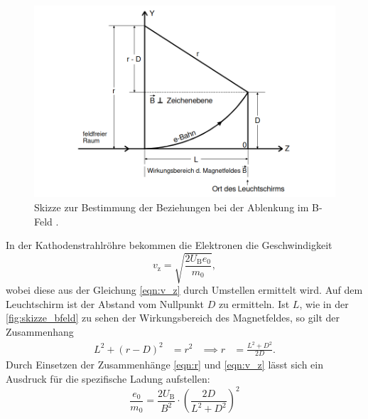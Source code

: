     \begin{figure} 
        \centering
        \includegraphics[width=\textwidth]{bilder/zeichnung_magnetfeld.png}
        \caption{Skizze zur Bestimmung der Beziehungen bei der Ablenkung im B-Feld \cite{anleitung502}.}
        \label{fig:skizze_bfeld}
    \end{figure}

    \noindent In der Kathodenstrahlröhre bekommen die Elektronen die Geschwindigkeit 
    \begin{equation*}
        v_{\text{z}} = \sqrt{\frac{2 U_{\text{B}}e_0}{m_0}},
    \end{equation*}
    wobei diese aus der Gleichung \eqref{eqn:v_z} durch Umstellen ermittelt wird. Auf dem Leuchtschirm ist der Abstand vom Nullpunkt $D$ zu ermitteln.
    Ist $L$, wie in der \autoref{fig:skizze_bfeld} zu sehen der Wirkungsbereich des Magnetfeldes, so gilt der Zusammenhang
    \begin{align*}
        L^2 + (r - D)^2 &= r^2  &\implies r &= \frac{L^2 + D^2}{2D}.
    \end{align*}
    Durch Einsetzen der Zusammenhänge \eqref{eqn:r} und \eqref{eqn:v_z} lässt sich ein Ausdruck für die spezifische Ladung aufstellen:
    \begin{equation}\label{eq:e0_m0}
        \frac{e_0}{m_0} = \frac{2 U_{\text{B}}}{B^2} \cdot \left(\frac{2D}{L^2 + D^2}\right)^2
    \end{equation}